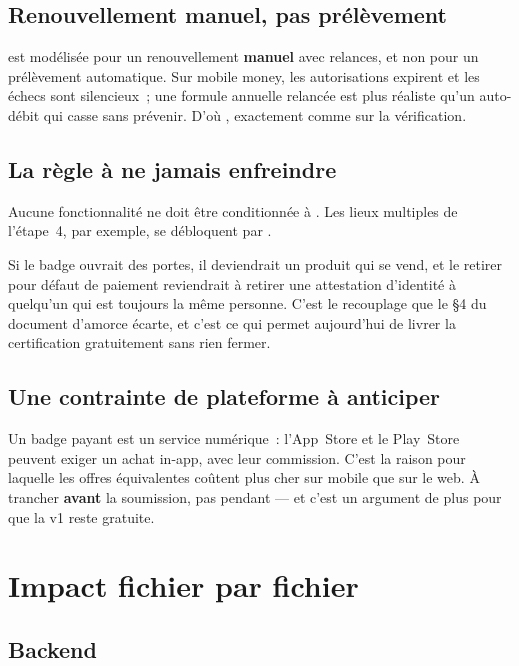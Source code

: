 \section{Renouvellement manuel, pas prélèvement}

 est modélisée pour un renouvellement \textbf{manuel} avec relances, et
non pour un prélèvement automatique. Sur mobile money, les autorisations expirent et les
échecs sont silencieux~; une formule annuelle relancée est plus réaliste qu'un auto-débit
qui casse sans prévenir. D'où , exactement comme sur la vérification.

\section{La règle à ne jamais enfreindre}

\begin{alerte}
Aucune fonctionnalité ne doit être conditionnée à . Les lieux
multiples de l'étape~4, par exemple, se débloquent par .

Si le badge ouvrait des portes, il deviendrait un produit qui se vend, et le retirer pour
défaut de paiement reviendrait à retirer une attestation d'identité à quelqu'un qui est
toujours la même personne. C'est le recouplage que le §4 du document d'amorce écarte, et
c'est ce qui permet aujourd'hui de livrer la certification gratuitement sans rien fermer.
\end{alerte}

\section{Une contrainte de plateforme à anticiper}

Un badge payant est un service numérique~: l'App~Store et le Play~Store peuvent exiger un
achat in-app, avec leur commission. C'est la raison pour laquelle les offres équivalentes
coûtent plus cher sur mobile que sur le web. À trancher \textbf{avant} la soumission, pas
pendant --- et c'est un argument de plus pour que la v1 reste gratuite.

\chapter{Impact fichier par fichier}

\section{Backend}

